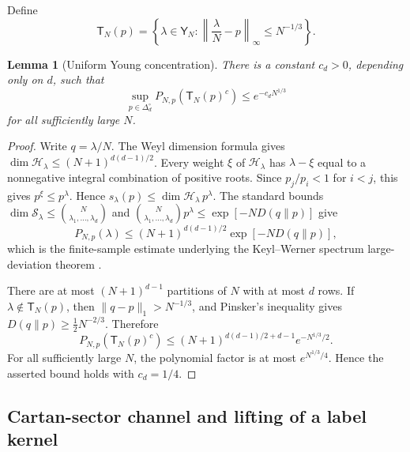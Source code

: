 \documentclass[11pt]{article}
\newtheorem{lemma}[lemma]{Lemma}
\theoremstyle{remark}
\theoremstyle{plain}
\newcommand{\cH}{\mathcal H}
\newcommand{\cS}{\mathcal S}
\begin{document}
Define
\[
  \mathsf T_N(p)
  =\left\{\lambda\in\mathsf Y_N:
  \left\|\frac\lambda N-p\right\|_\infty\le N^{-1/3}\right\}.
\]

\begin{lemma}[Uniform Young concentration]\label{lem:young-concentration}
There is a constant \(c_d>0\), depending only on \(d\), such that
\[
  \sup_{p\in\Delta_d^\circ}P_{N,p}(\mathsf T_N(p)^c)
  \le e^{-c_d N^{1/3}}
\]
for all sufficiently large \(N\).
\end{lemma}

\begin{proof}
Write \(q=\lambda/N\).  The Weyl dimension formula gives
\(\dim\cH_\lambda\le(N+1)^{d(d-1)/2}\).  Every weight \(\xi\) of
\(\cH_\lambda\) has \(\lambda-\xi\) equal to a nonnegative integral
combination of positive roots.  Since \(p_j/p_i<1\) for \(i<j\), this gives
\(p^\xi\le p^\lambda\).  Hence
\(s_\lambda(p)\le \dim\cH_\lambda\,p^\lambda\).
The standard bounds
\(\dim\cS_\lambda\le\binom{N}{\lambda_1,\ldots,\lambda_d}\) and
\(\binom{N}{\lambda_1,\ldots,\lambda_d}p^\lambda
\le \exp[-ND(q\|p)]\) give
\begin{equation}\label{eq:finite-Young-large-deviation}
  P_{N,p}(\lambda)
  \le (N+1)^{d(d-1)/2}\exp[-ND(q\|p)],
\end{equation}
which is the finite-sample estimate underlying the Keyl--Werner spectrum
large-deviation theorem \cite{KeylWerner2001Spectrum}.

There are at most \((N+1)^{d-1}\) partitions of \(N\) with at most \(d\)
rows.  If \(\lambda\notin\mathsf T_N(p)\), then
\(\|q-p\|_1>N^{-1/3}\), and Pinsker's inequality gives
\(D(q\|p)\ge\tfrac12N^{-2/3}\).  Therefore
\[
  P_{N,p}(\mathsf T_N(p)^c)
  \le (N+1)^{d(d-1)/2+d-1}e^{-N^{1/3}/2}.
\]
For all sufficiently large \(N\), the polynomial factor is at most
\(e^{N^{1/3}/4}\).  Hence the asserted bound holds with \(c_d=1/4\).
\end{proof}

\subsection{Cartan-sector channel and lifting of a label kernel}
\label{sec:cartan-sector-lifting}
\end{document}
